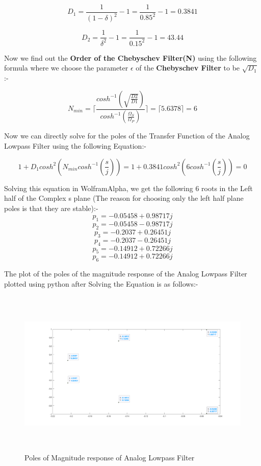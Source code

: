\documentclass[12pt]{article}
\begin{document}
\[D_{1} = \frac{1}{(1 - \delta)^2} - 1 = \frac{1}{0.85^2} - 1 = 0.3841\]

\[D_{2} = \frac{1}{\delta^2} - 1 = \frac{1}{0.15^2} - 1 = 43.44\]

Now we find out the \textbf{Order of the Chebyschev Filter(N)} using the following formula where we choose the parameter $\epsilon$ of the \textbf{Chebyschev Filter} to be $\sqrt{D_{1}}$:-

\[N_{min} = \lceil \frac{cosh^{-1}(\sqrt{\frac{D2}{D1}})}{cosh^{-1}(\frac{\Omega_{S}}{\Omega_{P}})} \rceil = \lceil 5.6378 \rceil = 6\]

Now we can directly solve for the poles of the Transfer Function of the Analog Lowpass Filter using the following Equation:-

\[1 + D_{1}cosh^{2}(N_{min}cosh^{-1}(\frac{s}{j})) = 1 + 0.3841cosh^{2}(6cosh^{-1}(\frac{s}{j})) = 0\]

Solving this equation in WolframAlpha, we get the following 6 roots in the Left half of the Complex s plane (The reason for choosing only the left half plane poles is that they are stable):-
\[p_{1} = -0.05458 + 0.98717j\]
\[p_{2} = -0.05458 - 0.98717j\]
\[p_{3} = -0.2037 + 0.26451j\]
\[p_{4} = -0.2037 - 0.26451j\]
\[p_{5} = -0.14912 + 0.72266j\]
\[p_{6} = -0.14912 + 0.72266j\]

The plot of the poles of the magnitude response of the Analog Lowpass Filter plotted using python after Solving the Equation is as follows:-

\begin{figure}[H]
    \centering
    \includegraphics[width =\textwidth, height=8cm]{poles.png}
    \caption{Poles of Magnitude response of Analog Lowpass Filter}
\end{figure}
\end{document}
